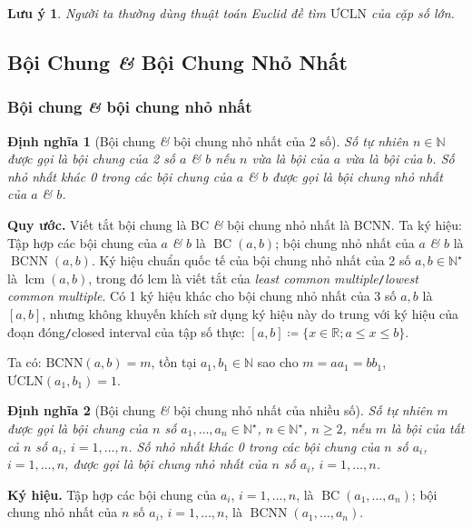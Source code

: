 \documentclass{article}
\numberwithin{equation}{section}
\newtheorem{dinhnghia}{Định nghĩa}[section]
\newtheorem{luuy}{Lưu ý}[section]
\begin{document}
\begin{luuy}
	Người ta thường dùng thuật toán Euclid đề tìm $\mbox{ƯCLN}$ của cặp số lớn.
\end{luuy}


\subsection{Bội Chung \textit{\&} Bội Chung Nhỏ Nhất}

\subsubsection{Bội chung \textit{\&} bội chung nhỏ nhất}

\begin{dinhnghia}[Bội chung \textit{\&} bội chung nhỏ nhất của 2 số]
	Số tự nhiên $n\in\mathbb{N}$ được gọi là \emph{bội chung} của 2 số $a$ \textit{\&} $b$ nếu $n$ vừa là bội của $a$ vừa là bội của $b$. Số nhỏ nhất khác 0 trong các bội chung của $a$ \textit{\&} $b$ được gọi là \emph{bội chung nhỏ nhất} của $a$ \textit{\&} $b$.
\end{dinhnghia}
\noindent\textbf{Quy ước.} Viết tắt bội chung là BC \textit{\&} bội chung nhỏ nhất là BCNN. Ta ký hiệu: Tập hợp các bội chung của $a$ \textit{\&} $b$ là $\operatorname{BC}(a,b)$; bội chung nhỏ nhất của $a$ \textit{\&} $b$ là $\operatorname{BCNN}(a,b)$. Ký hiệu chuẩn quốc tế của bội chung nhỏ nhất của 2 số $a,b\in\mathbb{N}^\star$ là $\operatorname{lcm}(a,b)$, trong đó lcm là viết tắt của \textit{least common multiple}\texttt{/}\textit{lowest common multiple}. Có 1 ký hiệu khác cho bội chung nhỏ nhất của 3 số $a,b$ là $[a,b]$, nhưng không khuyến khích sử dụng ký hiệu này do trung với ký hiệu của đoạn đóng\texttt{/}closed interval của tập số thực: $[a,b]\coloneqq\{x\in\mathbb{R};a\le x\le b\}$.

Ta có: $\mbox{BCNN}(a,b) = m$, tồn tại $a_1,b_1\in\mathbb{N}$ sao cho $m = aa_1 = bb_1$, $\mbox{ƯCLN}(a_1,b_1) = 1$.

\begin{dinhnghia}[Bội chung \textit{\&} bội chung nhỏ nhất của nhiều số]
	Số tự nhiên $m$ được gọi là \emph{bội chung} của $n$ số $a_1,\ldots,a_n\in\mathbb{N}^\star$, $n\in\mathbb{N}^\star$, $n\ge 2$, nếu $m$ là bội của tất cả $n$ số $a_i$, $i = 1,\ldots,n$. Số nhỏ nhất khác 0 trong các bội chung của $n$ số $a_i$, $i = 1,\ldots,n$, được gọi là \emph{bội chung nhỏ nhất} của $n$ số $a_i$, $i = 1,\ldots,n$.
\end{dinhnghia}
\noindent\textbf{Ký hiệu.} Tập hợp các bội chung của $a_i$, $i = 1,\ldots,n$, là $\operatorname{BC}(a_1,\ldots,a_n)$; bội chung nhỏ nhất của $n$ số $a_i$, $i = 1,\ldots,n$, là $\operatorname{BCNN}(a_1,\ldots,a_n)$.
\end{document}
